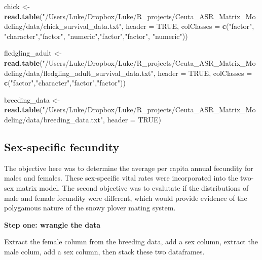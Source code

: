 \documentclass[]{article}
\newenvironment{Shaded}{\begin{snugshade}}{\end{snugshade}}
\newcommand{\KeywordTok}[1]{\textcolor[rgb]{0.13,0.29,0.53}{\textbf{{#1}}}}
\newcommand{\DataTypeTok}[1]{\textcolor[rgb]{0.13,0.29,0.53}{{#1}}}
\newcommand{\StringTok}[1]{\textcolor[rgb]{0.31,0.60,0.02}{{#1}}}
\newcommand{\OtherTok}[1]{\textcolor[rgb]{0.56,0.35,0.01}{{#1}}}
\newcommand{\NormalTok}[1]{{#1}}
\begin{document}
\begin{Shaded}
\begin{Highlighting}[]
\NormalTok{chick <-}\StringTok{ }
\StringTok{  }\KeywordTok{read.table}\NormalTok{(}\StringTok{"/Users/Luke/Dropbox/Luke/R_projects/Ceuta_ASR_Matrix_Modeling/data/chick_survival_data.txt"}\NormalTok{,}
             \DataTypeTok{header =} \OtherTok{TRUE}\NormalTok{, }\DataTypeTok{colClasses =} \KeywordTok{c}\NormalTok{(}\StringTok{"factor"}\NormalTok{, }\StringTok{"character"}\NormalTok{,}\StringTok{"factor"}\NormalTok{,}
                                           \StringTok{"numeric"}\NormalTok{,}\StringTok{"factor"}\NormalTok{,}\StringTok{"factor"}\NormalTok{, }\StringTok{"numeric"}\NormalTok{))}

\NormalTok{fledgling_adult <-}\StringTok{ }
\StringTok{  }\KeywordTok{read.table}\NormalTok{(}\StringTok{"/Users/Luke/Dropbox/Luke/R_projects/Ceuta_ASR_Matrix_Modeling/data/fledgling_adult_survival_data.txt"}\NormalTok{,}
             \DataTypeTok{header =} \OtherTok{TRUE}\NormalTok{, }\DataTypeTok{colClasses =} \KeywordTok{c}\NormalTok{(}\StringTok{"factor"}\NormalTok{,}\StringTok{"character"}\NormalTok{,}\StringTok{"factor"}\NormalTok{,}\StringTok{"factor"}\NormalTok{))}

\NormalTok{breeding_data <-}\StringTok{ }
\StringTok{  }\KeywordTok{read.table}\NormalTok{(}\StringTok{"/Users/Luke/Dropbox/Luke/R_projects/Ceuta_ASR_Matrix_Modeling/data/breeding_data.txt"}\NormalTok{, }
             \DataTypeTok{header =} \OtherTok{TRUE}\NormalTok{)}
\end{Highlighting}
\end{Shaded}

\subsection{Sex-specific fecundity}\label{sex-specific-fecundity}

The objective here was to determine the average per capita annual
fecundity for males and females. These sex-specific vital rates were
incorporated into the two-sex matrix model. The second objective was to
evalutate if the distributions of male and female fecundity were
different, which would provide evidence of the polygamous nature of the
snowy plover mating system.

\textbf{Step one: wrangle the data}

Extract the female column from the breeding data, add a sex column,
extract the male colum, add a sex column, then stack these two
dataframes.
\end{document}
